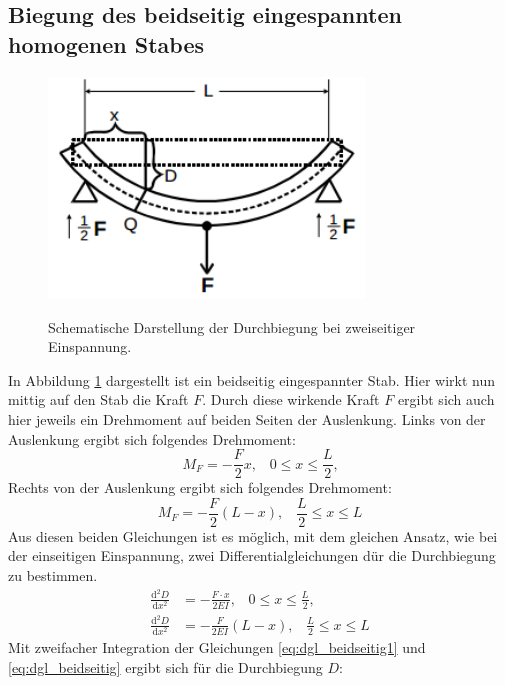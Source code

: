 \documentclass[
  bibliography=totoc,     %
  captions=tableheading,  %
  titlepage=firstiscover, %
]{scrartcl}
\begin{document}
\subsection{Biegung des beidseitig eingespannten homogenen Stabes}
\begin{figure}[H]
    \centering
    \caption{Schematische Darstellung der Durchbiegung bei zweiseitiger Einspannung.}
    \includegraphics[width=0.75\textwidth]{V1032.png}
    \label{fig:1032}
\end{figure}
In Abbildung \ref{fig:1032} dargestellt ist ein beidseitig eingespannter Stab.
Hier wirkt nun mittig auf den Stab die Kraft $F$. Durch diese wirkende Kraft $F$
ergibt sich auch hier jeweils ein Drehmoment auf beiden Seiten der Auslenkung.
Links von der Auslenkung ergibt sich folgendes Drehmoment:
\begin{equation}
	M_F=-\frac{F}{2}x, \;\;\; 0\leqslant  x\leqslant\frac{L}{2}\text{,}
\label{eq:Drehmoment_links}
\end{equation}
Rechts von der Auslenkung ergibt sich folgendes Drehmoment:
\begin{equation}
	M_F=-\frac{F}{2}(L-x), \;\;\; \frac{L}{2}\leqslant  x\leqslant L
\end{equation}
Aus diesen beiden Gleichungen ist es möglich, mit dem gleichen Ansatz, wie bei
der einseitigen Einspannung, zwei Differentialgleichungen dür die Durchbiegung
zu bestimmen.
\begin{align}
	\frac{\mathup{d}^2D}{\mathup{d}x^2}&=-\frac{F\cdot x}{2EI}, \;\;\; 0\leqslant x\leqslant\frac{L}{2}\text{,}
    \label{eq:dgl_beidseitig1} \\
	\frac{\mathup{d}^2D}{\mathup{d}x^2}&=-\frac{F}{2EI}(L-x), \;\;\; \frac{L}{2}\leqslant x\leqslant L
	\label{eq:dgl_beidseitig}
\end{align}
Mit zweifacher Integration der Gleichungen \ref{eq:dgl_beidseitig1} und
\ref{eq:dgl_beidseitig} ergibt sich für die Durchbiegung $D$:
\end{document}
